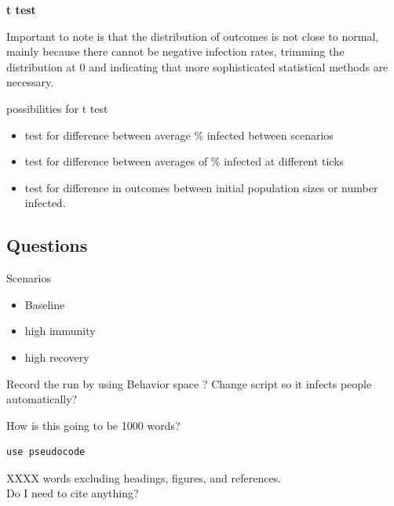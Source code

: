 \documentclass[11pt]{article} %
\begin{document}
\textbf{t test}

Important to note is that the distribution of outcomes is not close to normal, mainly because there cannot be negative infection rates, trimming the distribution at 0 and indicating that more sophisticated statistical methods are necessary. 


possibilities for t test
\begin{itemize}
\item test for difference between average \% infected between scenarios
\item test for difference between averages of \% infected at different ticks
\item test for difference in outcomes between initial population sizes or number infected. 
\end{itemize}

\subsection{Questions}




Scenarios
\begin{itemize}
\item Baseline 
\item high immunity
\item high recovery
\end{itemize}

Record the run by using Behavior space ?
Change script so it infects people automatically?

How is this going to be 1000 words? 



\begin{verbatim}
use pseudocode
\end{verbatim}

XXXX words excluding headings, figures, and references. \\

Do I need to cite anything? 

\nocite{*}


\printbibliography
\end{document}
